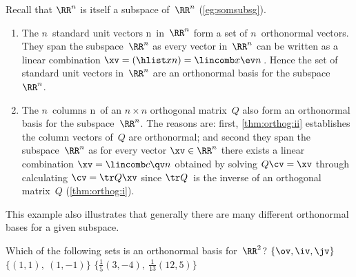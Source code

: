 \begin{example} \label{eg:}
Recall that \(\RR^n\) is itself a subspace of~\(\RR^n\) (\autoref{eg:somsubsg}).
\begin{enumerate}
\item The \(n\)~standard unit vectors \hlist\ev n\ in~\(\RR^n\) form a set of \(n\)~orthonormal vectors.
They span the subspace~\(\RR^n\) as every vector in~\(\RR^n\) can be written as a linear combination \(\xv=(\hlist xn)=\lincomb x\ev n\)\,.
Hence the set of standard unit vectors in~\(\RR^n\) are an orthonormal basis for the subspace~\(\RR^n\).

\item The \(n\)~columns \hlist\qv n\ of an \(n\times n\) orthogonal matrix~\(Q\) also form an orthonormal basis for the subspace~\(\RR^n\).
The reasons are: first, \autoref{thm:orthog:ii} establishes the column vectors of~\(Q\) are orthonormal; and second they span the subspace~\(\RR^n\) as for every vector \(\xv\in\RR^n\) there exists a linear combination \(\xv=\lincomb c\qv n\) obtained by solving \(Q\cv=\xv\) through calculating \(\cv=\tr Q\xv\) since \(\tr Q\)~is the inverse of an orthogonal matrix~\(Q\) (\autoref{thm:orthog:i}).
\end{enumerate}
This example also illustrates that generally there are many different orthonormal bases for a given subspace.
\end{example}



\begin{activity}
Which of the following sets is an orthonormal basis for~\(\RR^2\)?
{\(\{\ov,\iv,\jv\}\)}
{\(\{(1,1),\ (1,-1)\}\)}
{\(\{\frac15(3,-4),\ \frac1{13}(12,5)\}\)}
\end{activity}



